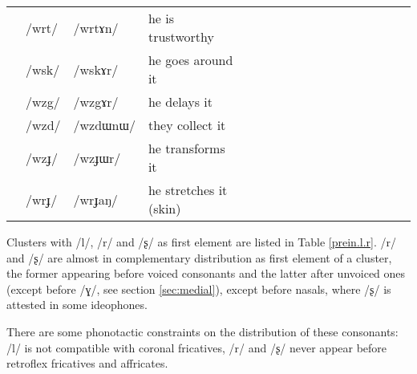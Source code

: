 \documentclass[oldfontcommands,oneside,a4paper,11pt]{article}
\newcommand{\ipa}[1]{/#1/} %
\newcommand{\trois}[1]{/#1/}
\newcommand{\tib}[1]{\cellcolor{lightgray}\textbf{#1}}
\begin{document}
\begin{table}
{\begin{tabular}{l|lll|lll|lll|lllllll}
&	\trois{wrt}  \tib{} &	\ipa{wrtɤn}  &	he is trustworthy\\
&	\trois{wsk}  \tib{} &	\ipa{wskɤr}  & he goes around it	\\
&	\trois{wzg}  \tib{} &	\ipa{wzgɤr}  & he delays it	\\
&	\trois{wzd}  \tib{} &	\ipa{wzdɯnɯ}  & they collect it	\\
&	\trois{wzɟ}  \tib{} &	\ipa{wzɟɯr}  & he transforms it	\\
&	\trois{wrɟ}  \tib{} &	\ipa{wrɟaŋ}  &he stretches it (skin)	\\
\bottomrule
\end{tabular}} 
\end{table}
 
 Clusters with /l/, /r/  and /ʂ/ as first element are listed in Table \ref{prein.l.r}. /r/ and /ʂ/ are almost in complementary distribution as first element of a cluster, the former appearing before voiced consonants and the latter after unvoiced ones (except before /ɣ/, see section \ref{sec:medial}), except before nasals, where /ʂ/ is attested in some ideophones.
 
 There are some phonotactic constraints on the distribution of these consonants: /l/ is not compatible with coronal fricatives, /r/ and /ʂ/ never appear before retroflex fricatives and affricates.  
 
\end{document}
